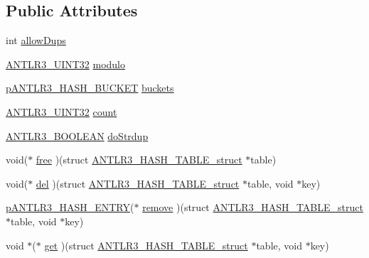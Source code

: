 \subsection*{Public Attributes}
\begin{DoxyCompactItemize}
\item 
int \hyperlink{struct_a_n_t_l_r3___h_a_s_h___t_a_b_l_e__struct_aaf47456b16dbdd1264fe4848bca47515}{allow\-Dups}
\item 
\hyperlink{antlr3defs_8h_ac41f744abd0fd25144b9eb9d11b1dfd1}{A\-N\-T\-L\-R3\-\_\-\-U\-I\-N\-T32} \hyperlink{struct_a_n_t_l_r3___h_a_s_h___t_a_b_l_e__struct_a3f2e7ebb23797000cbcb15ad5cfbdafe}{modulo}
\item 
\hyperlink{antlr3interfaces_8h_a6b4599875c7ed095604c8d31cb268b07}{p\-A\-N\-T\-L\-R3\-\_\-\-H\-A\-S\-H\-\_\-\-B\-U\-C\-K\-E\-T} \hyperlink{struct_a_n_t_l_r3___h_a_s_h___t_a_b_l_e__struct_a04189dd085126dbe5ebbae7c5643a041}{buckets}
\item 
\hyperlink{antlr3defs_8h_ac41f744abd0fd25144b9eb9d11b1dfd1}{A\-N\-T\-L\-R3\-\_\-\-U\-I\-N\-T32} \hyperlink{struct_a_n_t_l_r3___h_a_s_h___t_a_b_l_e__struct_ae9d4259b466763b862cabec5499158a1}{count}
\item 
\hyperlink{antlr3defs_8h_a5b33dccbba3b7212539695e21df4079b}{A\-N\-T\-L\-R3\-\_\-\-B\-O\-O\-L\-E\-A\-N} \hyperlink{struct_a_n_t_l_r3___h_a_s_h___t_a_b_l_e__struct_a5df7e657735afc6d734834aa9f5c51d7}{do\-Strdup}
\item 
void($\ast$ \hyperlink{struct_a_n_t_l_r3___h_a_s_h___t_a_b_l_e__struct_ad0d70d7b01ab03dd2bc74246c6c3432a}{free} )(struct \hyperlink{struct_a_n_t_l_r3___h_a_s_h___t_a_b_l_e__struct}{A\-N\-T\-L\-R3\-\_\-\-H\-A\-S\-H\-\_\-\-T\-A\-B\-L\-E\-\_\-struct} $\ast$table)
\item 
void($\ast$ \hyperlink{struct_a_n_t_l_r3___h_a_s_h___t_a_b_l_e__struct_a86f75baae8af4bd647ec057702b5cb8c}{del} )(struct \hyperlink{struct_a_n_t_l_r3___h_a_s_h___t_a_b_l_e__struct}{A\-N\-T\-L\-R3\-\_\-\-H\-A\-S\-H\-\_\-\-T\-A\-B\-L\-E\-\_\-struct} $\ast$table, void $\ast$key)
\item 
\hyperlink{antlr3interfaces_8h_a23202440c7441d8812a77e62318aafc9}{p\-A\-N\-T\-L\-R3\-\_\-\-H\-A\-S\-H\-\_\-\-E\-N\-T\-R\-Y}($\ast$ \hyperlink{struct_a_n_t_l_r3___h_a_s_h___t_a_b_l_e__struct_a0cd3cdef0fdf565c7b3e52bbefc68777}{remove} )(struct \hyperlink{struct_a_n_t_l_r3___h_a_s_h___t_a_b_l_e__struct}{A\-N\-T\-L\-R3\-\_\-\-H\-A\-S\-H\-\_\-\-T\-A\-B\-L\-E\-\_\-struct} $\ast$table, void $\ast$key)
\item 
void $\ast$($\ast$ \hyperlink{struct_a_n_t_l_r3___h_a_s_h___t_a_b_l_e__struct_ade55b338983760e1a32075c09268a3ce}{get} )(struct \hyperlink{struct_a_n_t_l_r3___h_a_s_h___t_a_b_l_e__struct}{A\-N\-T\-L\-R3\-\_\-\-H\-A\-S\-H\-\_\-\-T\-A\-B\-L\-E\-\_\-struct} $\ast$table, void $\ast$key)

\end{DoxyCompactItemize}
